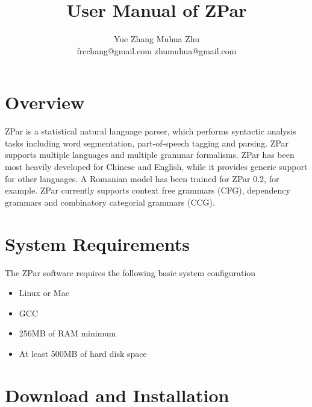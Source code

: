\documentclass[12pt]{article}
\title{User Manual of ZPar}
\author{Yue Zhang \hspace{3.5cm} Muhua Zhu \\
frcchang@gmail.com \hspace{1.0cm} zhumuhua@gmail.com
}
\begin{document}
\maketitle

\section{Overview}

ZPar is a statistical natural language parser, which performs syntactic analysis tasks including word segmentation, part-of-speech tagging and parsing. ZPar supports multiple languages and multiple grammar formalisms. ZPar has been most heavily developed for Chinese and English, while it provides generic support for other languages. A Romanian model has been trained for ZPar 0.2, for example. ZPar currently supports context free grammars (CFG), dependency grammars and combinatory categorial grammars (CCG).


\section{System Requirements}
The ZPar software requires the following basic system configuration
\begin{itemize}
\item Linux or Mac
\item GCC
\item 256MB of RAM minimum
\item At least 500MB of hard disk space
\end{itemize}

\section{Download and Installation}
\end{document}
